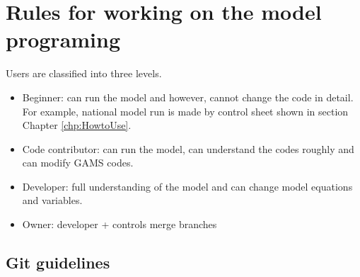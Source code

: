 \documentclass[10pt,a4paper,titlepage,dvipdfmx]{book}
\begin{document}
\section{\label{sec:RulWorModPro}Rules for working on the model programing}

Users are classified into three levels.
\begin{itemize}
\item Beginner: can run the model and however, cannot change the code in detail. For example, national model run is made by control sheet shown in section Chapter \ref{chp:HowtoUse}.
\item Code contributor: can run the model, can understand the codes roughly and can modify GAMS codes. 
\item Developer: full understanding of the model and can change model equations and variables.
\item Owner: developer + controls merge branches
\end{itemize}

\subsection{\label{subsec:GitGuid}Git guidelines}
\end{document}
